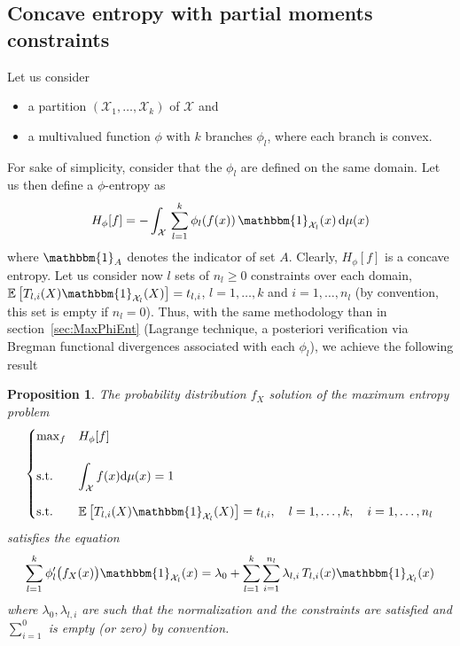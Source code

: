 \documentclass[english,onecolumn]{elsarticle}
\def\dmu{\mathrm{d}\mu}
\def\X{\mathcal{X}}
\def\un{\mathbbm{1}}
\newcommand\Esp[1]{\mathbb{E}\left[ #1 \right]}
\newtheorem{proposition}{Proposition}
\begin{document}

\subsection{Concave entropy with partial moments constraints}
\label{subsec:ConcaveMultiPhiEnt}

Let  us consider
%
\begin{itemize}
\item a partition $(\X_1,\ldots,\X_k)$ of $\X$ and
\item  a multivalued  function $\phi$  with  $k$ branches  $\phi_l$, where  each
  branch is convex.
\end{itemize}
%
For  sake of  simplicity, consider  that the  $\phi_l$ are  defined on  the same
domain.  Let us then define a $\phi$-entropy as
%
\begin{equation}
H_\phi[f] = -  \int_\X \, \sum_{l=1}^k \phi_l(f(x)) \, \un_{\X_l}(x) \, \dmu(x)
\label{eq:multiform-phi}
\end{equation}
%
where  $\un_A$ denotes  the indicator  of set  $A$.  Clearly,  $H_\phi[f]$  is a
concave entropy.  Let  us consider now $l$ sets of $n_l  \ge 0$ constraints over
each domain, $\Esp{ T_{l,i}(X) \un_{\X_l}(X)} = t_{l,i}$, $l = 1, \ldots, k$ and
$i =  1, \ldots, n_l$ (by  convention, this set is  empty if $n_l  = 0$).  Thus,
with  the same  methodology than  in section~\ref{sec:MaxPhiEnt} (Lagrange  technique, a
posteriori verification via Bregman  functional divergences associated with each
$\phi_l$), we achieve the following result
%
\begin{proposition}
  The   probability  distribution   $f_X$  solution   of  the   maximum  entropy
  problem
%
  \begin{equation}
  \begin{cases}
  \max_f & H_\phi[f]\\[5mm]
  \text{s.t. } & \displaystyle \int_\X f(x) \dmu(x) = 1\\[5mm]
  \text{s.t. } & \Esp{  T_{l,i}(X)  \un_{\X_l}(X)} = t_{l,i},
  \quad l = 1, \ldots, k, \quad i = 1, \ldots, n_l
  \end{cases}
  \label{eq:MaxEntMultiConcave}
  \end{equation}
  satisfies the equation
  \begin{equation}
  \sum_{l=1}^k \phi_l' \big( f_X(x) \big) \un_{\X_l}(x) = \lambda_0 +
  \sum_{l=1}^k \sum_{i=1}^{n_l} \lambda_{l,i} \, T_{l,i}(x)  \un_{\X_l}(x)
  \label{eq:sol-phi-multi-concave}
  \end{equation}
%
  where  $\lambda_0, \lambda_{l,i}$  are  such that  the  normalization and  the
  constraints are satisfied and  $\displaystyle \sum_{i=1}^0$ is empty (or zero)
  by convention.
\end{proposition}
\end{document}
